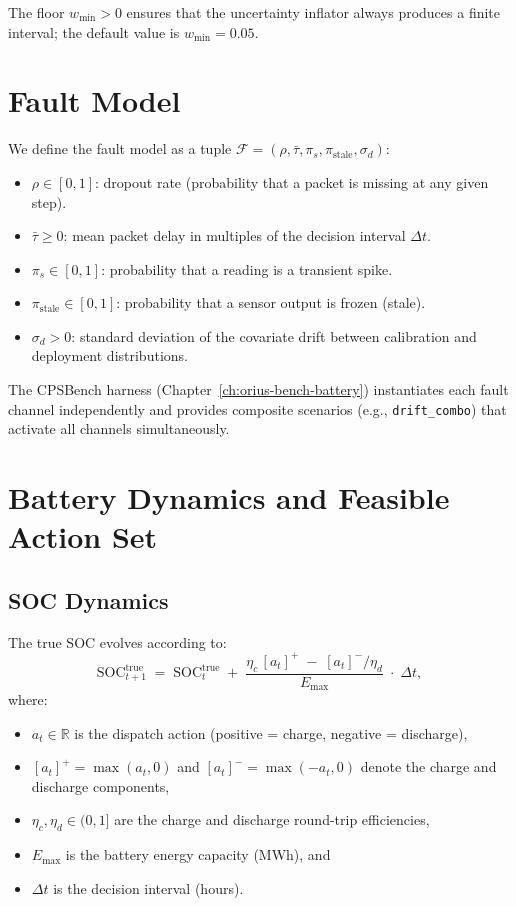 The floor $w_{\min} > 0$ ensures that the uncertainty inflator always
produces a finite interval; the default value is $w_{\min} = 0.05$.

\section{Fault Model}
\label{sec:fault-model}

We define the fault model as a tuple
$\mathcal{F} = (\rho, \bar{\tau}, \pi_s, \pi_{\mathrm{stale}}, \sigma_d)$:

\begin{itemize}
  \item $\rho \in [0, 1]$: dropout rate (probability that a packet is
    missing at any given step).
  \item $\bar{\tau} \ge 0$: mean packet delay in multiples of the
    decision interval $\Delta t$.
  \item $\pi_s \in [0, 1]$: probability that a reading is a transient
    spike.
  \item $\pi_{\mathrm{stale}} \in [0, 1]$: probability that a sensor
    output is frozen (stale).
  \item $\sigma_d > 0$: standard deviation of the covariate drift between
    calibration and deployment distributions.
\end{itemize}

The CPSBench harness (Chapter~\ref{ch:orius-bench-battery}) instantiates
each fault channel independently and provides composite scenarios
(e.g., \texttt{drift\_combo}) that activate all channels simultaneously.

\section{Battery Dynamics and Feasible Action Set}
\label{sec:battery-dynamics}

\subsection{SOC Dynamics}

The true SOC evolves according to:
\begin{equation}
\label{eq:soc-dynamics}
  \mathrm{SOC}_{t+1}^{\mathrm{true}} \;=\;
  \mathrm{SOC}_t^{\mathrm{true}}
  \;+\; \frac{\eta_c\,[a_t]^{+} \;-\; [a_t]^{-}/\eta_d}{E_{\max}}
  \;\cdot\; \Delta t,
\end{equation}
where:
\begin{itemize}
  \item $a_t \in \mathbb{R}$ is the dispatch action (positive = charge,
    negative = discharge),
  \item $[a_t]^{+} = \max(a_t, 0)$ and $[a_t]^{-} = \max(-a_t, 0)$
    denote the charge and discharge components,
  \item $\eta_c, \eta_d \in (0, 1]$ are the charge and discharge
    round-trip efficiencies,
  \item $E_{\max}$ is the battery energy capacity (MWh), and
  \item $\Delta t$ is the decision interval (hours).
\end{itemize}

